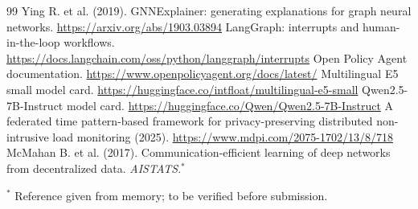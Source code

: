 \begin{thebibliography}{99}
 Ying R. et al. (2019). GNNExplainer: generating explanations for graph neural networks. \url{https://arxiv.org/abs/1903.03894}
 LangGraph: interrupts and human-in-the-loop workflows. \url{https://docs.langchain.com/oss/python/langgraph/interrupts}
 Open Policy Agent documentation. \url{https://www.openpolicyagent.org/docs/latest/}
 Multilingual E5 small model card. \url{https://huggingface.co/intfloat/multilingual-e5-small}
 Qwen2.5-7B-Instruct model card. \url{https://huggingface.co/Qwen/Qwen2.5-7B-Instruct}
 A federated time pattern-based framework for privacy-preserving distributed non-intrusive load monitoring (2025). \url{https://www.mdpi.com/2075-1702/13/8/718}
 McMahan B. et al. (2017). Communication-efficient learning of deep networks from decentralized data. \emph{AISTATS}.$^{*}$
\end{thebibliography}
{\small $^{*}$ Reference given from memory; to be verified before submission.}
